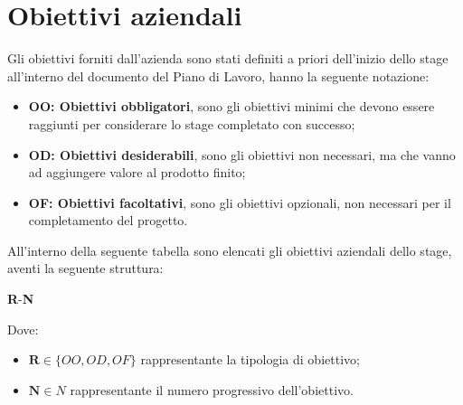 \section{Obiettivi aziendali}
\label{sez:obiettivi-aziendali}

Gli obiettivi forniti dall'azienda sono stati definiti a priori dell'inizio dello stage all'interno del documento del Piano di Lavoro, hanno la seguente notazione:
\begin{itemize}
    \item \textbf{OO: Obiettivi obbligatori}, sono gli obiettivi minimi che devono essere raggiunti per considerare lo stage completato con successo;
    \item \textbf{OD: Obiettivi desiderabili}, sono gli obiettivi non necessari, ma che vanno ad aggiungere valore al prodotto finito;
    \item \textbf{OF: Obiettivi facoltativi}, sono gli obiettivi opzionali, non necessari per il completamento del progetto.
\end{itemize}

All'interno della seguente tabella sono elencati gli obiettivi aziendali dello stage, aventi la seguente struttura:

\begin{center}
    \textbf{R}-\textbf{N}
\end{center}

Dove:
\begin{itemize}
    \item $\textbf{R} \in  \{OO, OD, OF\}$ rappresentante la tipologia di obiettivo; \\
    \item $\textbf{N} \in N$ rappresentante il numero progressivo dell'obiettivo.
\end{itemize}